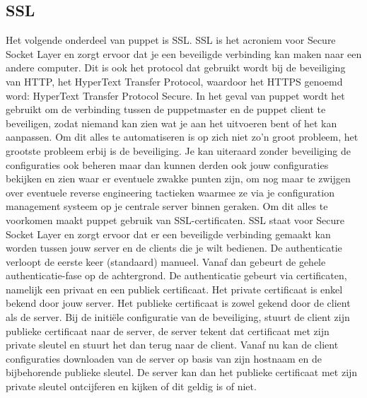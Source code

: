 \subsection{SSL}
Het volgende onderdeel van puppet is SSL. SSL is het acroniem voor Secure Socket Layer en zorgt ervoor dat je een beveiligde verbinding kan maken naar een andere computer. Dit is ook het protocol dat gebruikt wordt bij de beveiliging van HTTP, het HyperText Transfer Protocol, waardoor het HTTPS genoemd word: HyperText Transfer Protocol Secure. In het geval van puppet wordt het gebruikt om de verbinding tussen de puppetmaster en de puppet client te beveiligen, zodat niemand kan zien wat je aan het uitvoeren bent of het kan aanpassen.
%
Om dit alles te automatiseren is op zich niet zo'n groot probleem, het grootste probleem erbij is de beveiliging. Je kan uiteraard zonder beveiliging de configuraties ook beheren maar dan kunnen derden ook jouw configuraties bekijken en zien waar er eventuele zwakke punten zijn, om nog maar te zwijgen over eventuele reverse engineering tactieken waarmee ze via je configuration management systeem op je centrale server binnen geraken. Om dit alles te voorkomen maakt puppet gebruik van SSL-certificaten. SSL staat voor Secure Socket Layer en zorgt ervoor dat er een beveiligde verbinding gemaakt kan worden tussen jouw server en de clients die je wilt bedienen. De authenticatie verloopt de eerste keer (standaard) manueel. Vanaf dan gebeurt de gehele authenticatie-fase op de achtergrond. De authenticatie gebeurt via certificaten, namelijk een privaat en een publiek certificaat. Het private certificaat is enkel bekend door jouw server. Het publieke certificaat is zowel gekend door de client als de server. Bij de initi\"ele configuratie van de beveiliging, stuurt de client zijn publieke certificaat naar de server, de server tekent dat certificaat met zijn private sleutel en stuurt het dan terug naar de client. Vanaf nu kan de client configuraties downloaden van de server op basis van zijn hostnaam en de bijbehorende publieke sleutel. De server kan dan het publieke certificaat met zijn private sleutel ontcijferen en kijken of dit geldig is of niet.

